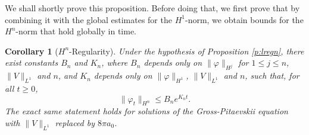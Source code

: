 \documentclass[11pt,a4paper,draft,DIV11]{scrartcl}	%
\newtheorem{cor}[thm]{Corollary}
\begin{document}
We shall shortly prove this proposition. Before doing that, we first prove
that by combining it with the global estimates for the $H^1$-norm, we obtain
bounds for the $H^n$-norm that hold globally in time.


\begin{cor}[$H^n$-Regularity] \label{c:regn}
  Under the hypothesis of Proposition \ref{p:lregn}, there exist constants
  $B_n$ and $K_n$, where $B_n$ depends only on $\| \varphi \|_{H^j}$ for $1
  \le j \le n$, $\| V \|_{L^1}$ and $n$, and $K_n$ depends only on $\|
  \varphi \|_{H^1}$, $\| V \|_{L^1}$ and $n$, such that, for all $t \ge 0$,
  \[
    \| \varphi_t \|_{H^n} \le B_n e^{K_n t}.
  \]
  The exact same statement holds for solutions of the Gross-Pitaevskii
  equation with $\| V \|_{L^1}$ replaced by $8 \pi a_0$.
\end{cor}
\end{document}
